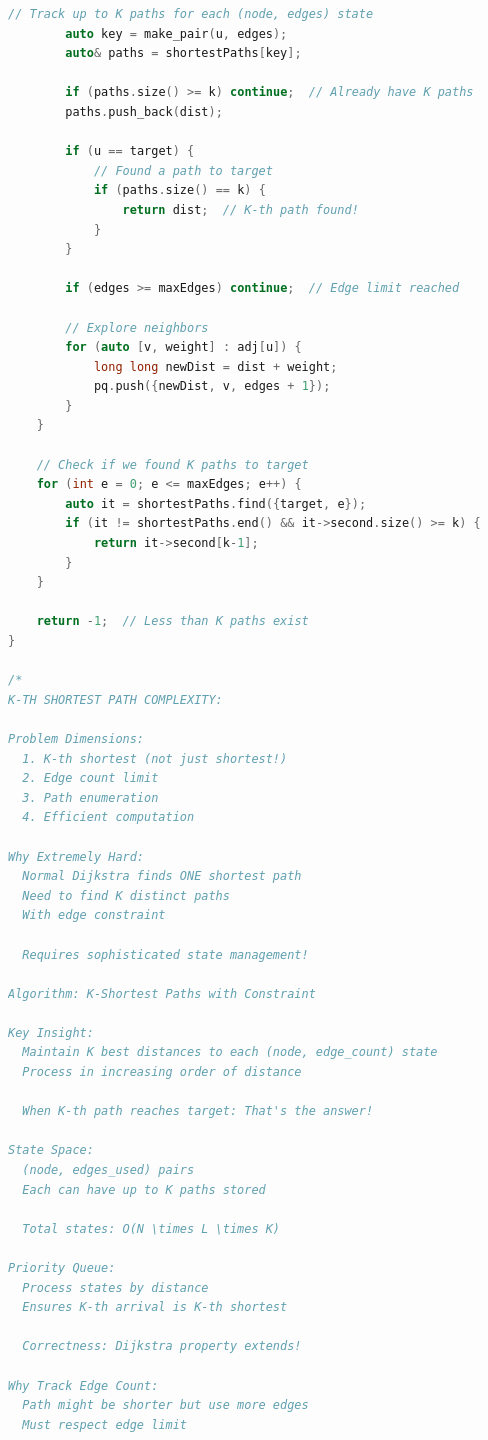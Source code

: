 \documentclass[11pt,a4paper,oneside]{book}
\begin{document}
\begin{lstlisting}[language=C++, caption=ELITE Graph BS Challenges - Complete Solutions]
        // Track up to K paths for each (node, edges) state
        auto key = make_pair(u, edges);
        auto& paths = shortestPaths[key];
        
        if (paths.size() >= k) continue;  // Already have K paths
        paths.push_back(dist);
        
        if (u == target) {
            // Found a path to target
            if (paths.size() == k) {
                return dist;  // K-th path found!
            }
        }
        
        if (edges >= maxEdges) continue;  // Edge limit reached
        
        // Explore neighbors
        for (auto [v, weight] : adj[u]) {
            long long newDist = dist + weight;
            pq.push({newDist, v, edges + 1});
        }
    }
    
    // Check if we found K paths to target
    for (int e = 0; e <= maxEdges; e++) {
        auto it = shortestPaths.find({target, e});
        if (it != shortestPaths.end() && it->second.size() >= k) {
            return it->second[k-1];
        }
    }
    
    return -1;  // Less than K paths exist
}

/*
K-TH SHORTEST PATH COMPLEXITY:

Problem Dimensions:
  1. K-th shortest (not just shortest!)
  2. Edge count limit
  3. Path enumeration
  4. Efficient computation

Why Extremely Hard:
  Normal Dijkstra finds ONE shortest path
  Need to find K distinct paths
  With edge constraint
  
  Requires sophisticated state management!

Algorithm: K-Shortest Paths with Constraint

Key Insight:
  Maintain K best distances to each (node, edge_count) state
  Process in increasing order of distance
  
  When K-th path reaches target: That's the answer!

State Space:
  (node, edges_used) pairs
  Each can have up to K paths stored
  
  Total states: O(N \times L \times K)

Priority Queue:
  Process states by distance
  Ensures K-th arrival is K-th shortest
  
  Correctness: Dijkstra property extends!

Why Track Edge Count:
  Path might be shorter but use more edges
  Must respect edge limit
  

\end{lstlisting}
\end{document}
